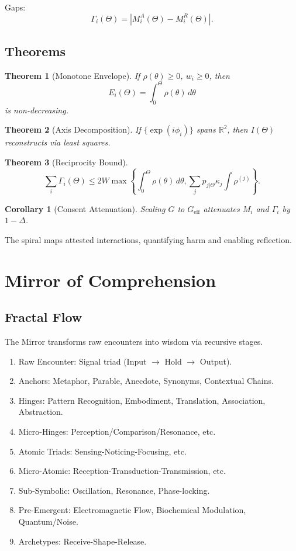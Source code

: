 \documentclass[11pt,a4paper]{article}
\theoremstyle{plain}
\newtheorem{theorem}{Theorem}
\newtheorem{corollary}{Corollary}
\begin{document}
Gaps:
\[
\Gamma_i(\Theta) = |M_i^A(\Theta) - M_i^R(\Theta)|.
\]

\subsection{Theorems}

\begin{theorem}[Monotone Envelope]
If $\rho(\theta) \geq 0$, $w_i \geq 0$, then
\[
E_i(\Theta) = \int_0^\Theta \rho(\theta) \, d\theta
\]
is non-decreasing.
\end{theorem}

\begin{theorem}[Axis Decomposition]
If $\{\exp(i\phi_i)\}$ spans $\mathbb{R}^2$, then $I(\Theta)$ reconstructs via least squares.
\end{theorem}

\begin{theorem}[Reciprocity Bound]
\[
\sum_i \Gamma_i(\Theta) \leq 2W \max\left\{\int_0^\Theta \rho(\theta) \, d\theta, \sum_j p_{j|\Theta} \kappa_j \int \rho^{(j)}\right\}.
\]
\end{theorem}

\begin{corollary}[Consent Attenuation]
Scaling $G$ to $G_{\mathrm{eff}}$ attenuates $M_i$ and $\Gamma_i$ by $1 - \Delta$.
\end{corollary}

The spiral maps attested interactions, quantifying harm and enabling reflection.

\section{Mirror of Comprehension}

\subsection{Fractal Flow}

The Mirror transforms raw encounters into wisdom via recursive stages.

\begin{enumerate}[label=Stage \arabic*:, leftmargin=*]
    \item Raw Encounter: Signal triad (Input $\to$ Hold $\to$ Output).
    \item Anchors: Metaphor, Parable, Anecdote, Synonyms, Contextual Chains.
    \item Hinges: Pattern Recognition, Embodiment, Translation, Association, Abstraction.
    \item Micro-Hinges: Perception/Comparison/Resonance, etc.
    \item Atomic Triads: Sensing-Noticing-Focusing, etc.
    \item Micro-Atomic: Reception-Transduction-Transmission, etc.
    \item Sub-Symbolic: Oscillation, Resonance, Phase-locking.
    \item Pre-Emergent: Electromagnetic Flow, Biochemical Modulation, Quantum/Noise.
    \item Archetypes: Receive-Shape-Release.
\end{enumerate}
\end{document}
